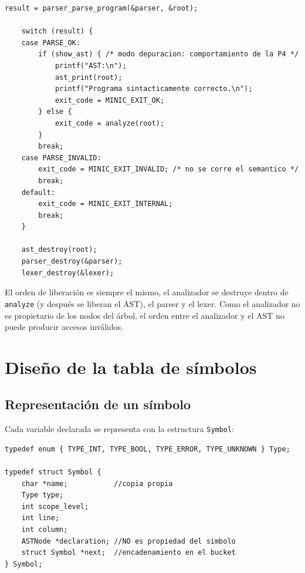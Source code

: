 \documentclass[12pt,letterpaper]{article}
\begin{document}
\begin{lstlisting}[style=modernc, caption={Flujo de \texttt{compile} en \texttt{main.c}, resumido.}]
    result = parser_parse_program(&parser, &root);

    switch (result) {
    case PARSE_OK:
        if (show_ast) { /* modo depuracion: comportamiento de la P4 */
            printf("AST:\n");
            ast_print(root);
            printf("Programa sintacticamente correcto.\n");
            exit_code = MINIC_EXIT_OK;
        } else {
            exit_code = analyze(root);
        }
        break;
    case PARSE_INVALID:
        exit_code = MINIC_EXIT_INVALID; /* no se corre el semantico */
        break;
    default:
        exit_code = MINIC_EXIT_INTERNAL;
        break;
    }

    ast_destroy(root);
    parser_destroy(&parser);
    lexer_destroy(&lexer);
\end{lstlisting}

\bigskip

El orden de liberación es siempre el mismo, el analizador se destruye dentro de \texttt{analyze} (y después se
liberan el AST), el parser y el lexer. Como el analizador no es propietario de los nodos del árbol, el orden
entre el analizador y el AST no puede producir accesos inválidos.

\section*{Diseño de la tabla de símbolos}

\subsection*{Representación de un símbolo}

Cada variable declarada se representa con la estructura \texttt{Symbol}:

\begin{lstlisting}[style=modernc, caption={Estructura \texttt{Symbol} de \texttt{symbol.h}.}]
typedef enum { TYPE_INT, TYPE_BOOL, TYPE_ERROR, TYPE_UNKNOWN } Type;

typedef struct Symbol {
    char *name;           //copia propia
    Type type;
    int scope_level;
    int line;
    int column;
    ASTNode *declaration; //NO es propiedad del simbolo
    struct Symbol *next;  //encadenamiento en el bucket
} Symbol;
\end{lstlisting}
\end{document}
